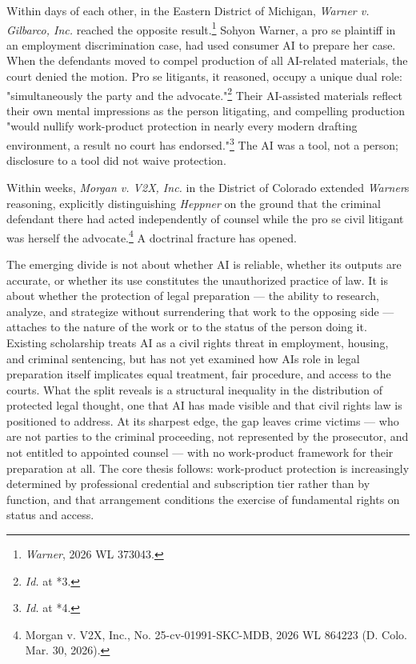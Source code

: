 \documentclass[
  12pt,
]{article}
\begin{document}
Within days of each other, in the Eastern District of Michigan,
\emph{Warner v. Gilbarco, Inc.} reached the opposite result.\footnote{\emph{Warner},
  2026 WL 373043.} Sohyon Warner, a pro se plaintiff in an employment
discrimination case, had used consumer AI to prepare her case. When the
defendants moved to compel production of all AI-related materials, the
court denied the motion. Pro se litigants, it reasoned, occupy a unique
dual role: "simultaneously the party and the advocate."\footnote{\emph{Id.}
  at *3.} Their AI-assisted materials reflect their own mental
impressions as the person litigating, and compelling production "would
nullify work-product protection in nearly every modern drafting
environment, a result no court has endorsed."\footnote{\emph{Id.} at *4.}
The AI was a tool, not a person; disclosure to a tool did not waive
protection.

Within weeks, \emph{Morgan v. V2X, Inc.} in the District of Colorado
extended \emph{Warner}\textquotesingle s reasoning, explicitly
distinguishing \emph{Heppner} on the ground that the criminal defendant
there had acted independently of counsel while the pro se civil litigant
was herself the advocate.\footnote{Morgan v. V2X, Inc., No.
  25-cv-01991-SKC-MDB, 2026 WL 864223 (D. Colo. Mar. 30, 2026).} A
doctrinal fracture has opened.

The emerging divide is not about whether AI is reliable, whether its
outputs are accurate, or whether its use constitutes the unauthorized
practice of law. It is about whether the protection of legal preparation
--- the ability to research, analyze, and strategize without
surrendering that work to the opposing side --- attaches to the nature
of the work or to the status of the person doing it. Existing
scholarship treats AI as a civil rights threat in employment, housing,
and criminal sentencing, but has not yet examined how
AI\textquotesingle s role in legal preparation itself implicates equal
treatment, fair procedure, and access to the courts. What the split
reveals is a structural inequality in the distribution of protected
legal thought, one that AI has made visible and that civil rights law is
positioned to address. At its sharpest edge, the gap leaves crime
victims --- who are not parties to the criminal proceeding, not
represented by the prosecutor, and not entitled to appointed counsel ---
with no work-product framework for their preparation at all. The core
thesis follows: work-product protection is increasingly determined by
professional credential and subscription tier rather than by function,
and that arrangement conditions the exercise of fundamental rights on
status and access.
\end{document}
